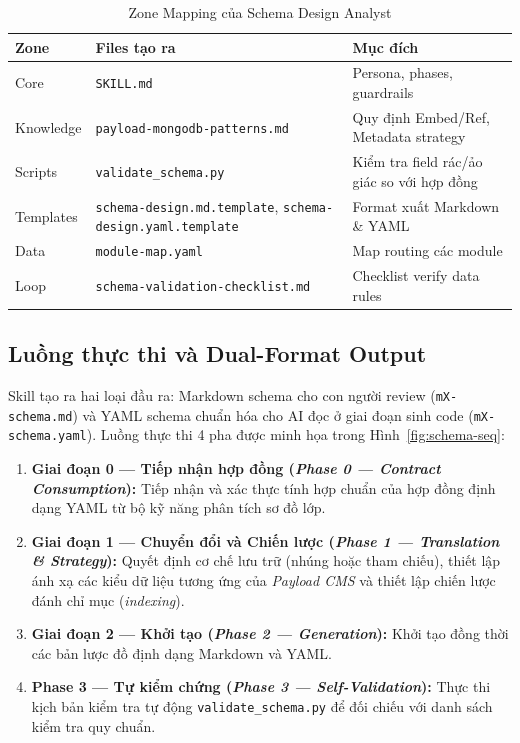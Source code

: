 \documentclass[13pt,a4paper,oneside]{extreport}
\numberwithin{equation}{chapter}
\numberwithin{figure}{chapter}
\numberwithin{table}{chapter}
\begin{document}
\begin{table}[ht]
\centering
\caption{Zone Mapping của Schema Design Analyst}
\begin{tabular}{|p{2.5cm}|p{6cm}|p{5cm}|}
\hline
\textbf{Zone} & \textbf{Files tạo ra} & \textbf{Mục đích} \\
\hline
Core & \texttt{SKILL.md} & Persona, phases, guardrails \\
\hline
Knowledge & \texttt{payload-mongodb-patterns.md} & Quy định Embed/Ref, Metadata strategy \\
\hline
Scripts & \texttt{validate\_schema.py} & Kiểm tra field rác/ảo giác so với hợp đồng \\
\hline
Templates & \texttt{schema-design.md.template}, \texttt{schema-design.yaml.template} & Format xuất Markdown \& YAML \\
\hline
Data & \texttt{module-map.yaml} & Map routing các module \\
\hline
Loop & \texttt{schema-validation-checklist.md} & Checklist verify data rules \\
\hline
\end{tabular}
\end{table}

\subsection{Luồng thực thi và Dual-Format Output}

Skill tạo ra hai loại đầu ra: Markdown schema cho con người review (\texttt{mX-schema.md}) và YAML schema chuẩn hóa cho AI đọc ở giai đoạn sinh code (\texttt{mX-schema.yaml}). Luồng thực thi 4 pha được minh họa trong Hình~\ref{fig:schema-seq}:

\begin{enumerate}
    \item \textbf{Giai đoạn 0 — Tiếp nhận hợp đồng (\textit{Phase 0 — Contract Consumption}):} Tiếp nhận và xác thực tính hợp chuẩn của hợp đồng định dạng YAML từ bộ kỹ năng phân tích sơ đồ lớp.
    \item \textbf{Giai đoạn 1 — Chuyển đổi và Chiến lược (\textit{Phase 1 — Translation \& Strategy}):} Quyết định cơ chế lưu trữ (nhúng hoặc tham chiếu), thiết lập ánh xạ các kiểu dữ liệu tương ứng của \textit{Payload CMS} và thiết lập chiến lược đánh chỉ mục (\textit{indexing}).
    \item \textbf{Giai đoạn 2 — Khởi tạo (\textit{Phase 2 — Generation}):} Khởi tạo đồng thời các bản lược đồ định dạng Markdown và YAML.
    \item \textbf{Phase 3 — Tự kiểm chứng (\textit{Phase 3 — Self-Validation}):} Thực thi kịch bản kiểm tra tự động \texttt{validate\_schema.py} để đối chiếu với danh sách kiểm tra quy chuẩn.
\end{enumerate}
\end{document}
